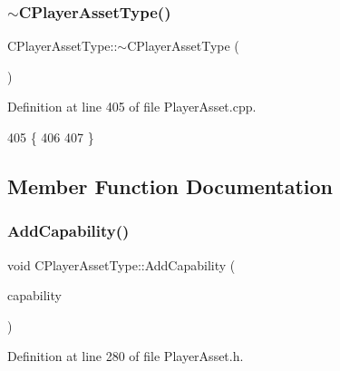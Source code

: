 \hypertarget{classCPlayerAssetType_a9947252d810ba38966f0bae54f35c7b4}{}\label{classCPlayerAssetType_a9947252d810ba38966f0bae54f35c7b4} 
\subsubsection{\texorpdfstring{$\sim$\+C\+Player\+Asset\+Type()}{~CPlayerAssetType()}}
{\footnotesize\ttfamily C\+Player\+Asset\+Type\+::$\sim$\+C\+Player\+Asset\+Type (\begin{DoxyParamCaption}{ }\end{DoxyParamCaption})}



Definition at line 405 of file Player\+Asset.\+cpp.


\begin{DoxyCode}
405                                    \{
406     
407 \}
\end{DoxyCode}


\subsection{Member Function Documentation}
\hypertarget{classCPlayerAssetType_ae9661ff35f54eedb4b7cd132c4f34174}{}\label{classCPlayerAssetType_ae9661ff35f54eedb4b7cd132c4f34174} 
\subsubsection{\texorpdfstring{Add\+Capability()}{AddCapability()}}
{\footnotesize\ttfamily void C\+Player\+Asset\+Type\+::\+Add\+Capability (\begin{DoxyParamCaption}\item[{\hyperlink{GameDataTypes_8h_a35b98ce26aca678b03c6f9f76e4778ce}{E\+Asset\+Capability\+Type}}]{capability }\end{DoxyParamCaption})\hspace{0.3cm}{\ttfamily [inline]}}



Definition at line 280 of file Player\+Asset.\+h.


